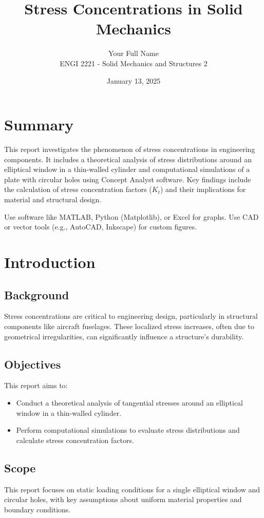 \documentclass[a4paper,11pt]{article}
\title{Stress Concentrations in Solid Mechanics}
\author{Your Full Name \\ ENGI 2221 - Solid Mechanics and Structures 2}
\date{January 13, 2025}
\begin{document}
\maketitle

\tableofcontents
\newpage

\section*{Summary}
This report investigates the phenomenon of stress concentrations in engineering components. It includes a theoretical analysis of stress distributions around an elliptical window in a thin-walled cylinder and computational simulations of a plate with circular holes using Concept Analyst software. Key findings include the calculation of stress concentration factors (\(K_t\)) and their implications for material and structural design.

Use software like MATLAB, Python (Matplotlib), or Excel for graphs.
Use CAD or vector tools (e.g., AutoCAD, Inkscape) for custom figures.


\newpage

\section{Introduction}
\subsection{Background}
Stress concentrations are critical to engineering design, particularly in structural components like aircraft fuselages. These localized stress increases, often due to geometrical irregularities, can significantly influence a structure's durability.

\subsection{Objectives}
This report aims to:
\begin{itemize}
    \item Conduct a theoretical analysis of tangential stresses around an elliptical window in a thin-walled cylinder.
    \item Perform computational simulations to evaluate stress distributions and calculate stress concentration factors.
\end{itemize}

\subsection{Scope}
This report focuses on static loading conditions for a single elliptical window and circular holes, with key assumptions about uniform material properties and boundary conditions.
\end{document}
